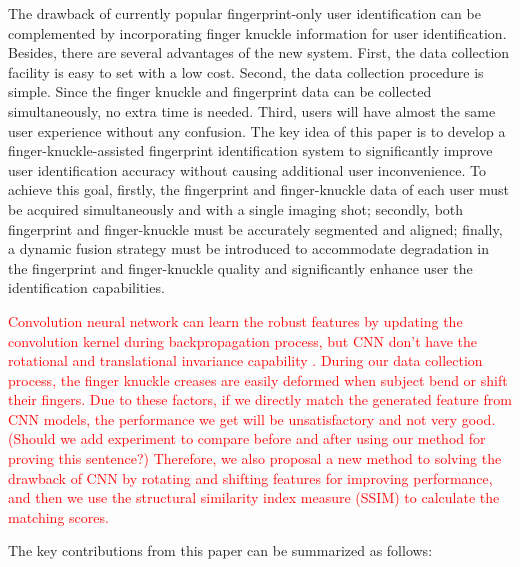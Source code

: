 The drawback of currently popular fingerprint-only user identification can be complemented by incorporating finger knuckle information for user identification. Besides, there are several advantages of the new system. First, the data collection facility is easy to set with a low cost. Second, the data collection procedure is simple. Since the finger knuckle and fingerprint data can be collected simultaneously, no extra time is needed. Third, users will have almost the same user experience without any confusion. The key idea of this paper is to develop a finger-knuckle-assisted fingerprint identification system to significantly improve user identification accuracy without causing additional user inconvenience. To achieve this goal, firstly, the fingerprint and finger-knuckle data of each user must be acquired simultaneously and with a single imaging shot; secondly, both fingerprint and finger-knuckle must be accurately segmented and aligned; finally, a dynamic fusion strategy must be introduced to accommodate degradation in the fingerprint and finger-knuckle quality and significantly enhance user the identification capabilities.

\textcolor{red}{Convolution neural network can learn the robust features by updating the convolution kernel during backpropagation process, but CNN don't have the rotational and translational invariance capability \cite{jaderberg2015spatial}. During our data collection process, the finger knuckle creases are easily deformed when subject bend or shift their fingers. Due to these factors, if we directly match the generated feature from CNN models, the performance we get will be unsatisfactory and not very good. (Should we add experiment to compare before and after using our method for proving this sentence?) Therefore, we also proposal a new method to solving the drawback of CNN by rotating and shifting features for improving performance, and then we use the structural similarity index measure (SSIM) \cite{wang2004image} to calculate the matching scores.}

The key contributions from this paper can be summarized as follows: 

